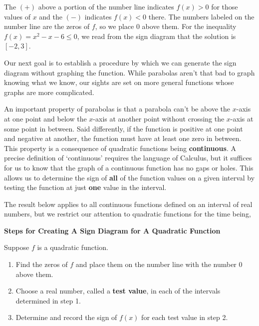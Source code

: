 \documentclass{ximera}
\begin{document}
The $(+)$ above a portion of the number line indicates $f(x) > 0$ for those values of $x$ and the $(-)$ indicates $f(x) < 0$ there.  The numbers labeled on the number line are the zeros of $f$, so we place $0$ above them.  For the inequality $f(x) = x^2-x-6 \leq 0$, we read from the sign diagram that the solution is $[-2,3]$.  

\medskip

Our next goal is to establish a procedure by which we can generate the sign diagram without graphing the function.  While parabolas aren't that bad to graph knowing what we know, our sights are set on more general functions whose graphs are more complicated.  

\medskip
\enlargethispage{.in}

An important property of parabolas is that a parabola can't be above the $x$-axis at one point and below the $x$-axis at another point without crossing the $x$-axis at some point in between. Said differently, if the function is positive at one point and negative at another, the function must have at least one zero in between.  This property is a consequence of quadratic functions being \textbf{continuous}.  A precise definition of `continuous' requires the language of Calculus, but it suffices for us to know that the graph of a continuous function has no gaps or holes.   This allows us to determine the sign of \textbf{all} of the function values on a given interval by testing the function at just \textbf{one} value in the interval.  

\medskip

The result below applies to all continuous functions defined on an interval of real numbers, but we restrict our attention to quadratic functions for the time being,

\medskip

\colorbox{ResultColor}{\bbm

\centerline{\textbf{Steps for Creating A Sign Diagram for A Quadratic Function}} 

\smallskip

Suppose $f$ is a quadratic function.

\begin{enumerate}

\item  Find the zeros of $f$ and place them on the number line with the number $0$ above them.

\item  Choose a real number, called a \textbf{test value}, in each of the intervals determined in step 1. 

\item  Determine and record the sign of $f(x)$ for each test value in step 2.

\end{enumerate}

\ebm}
\end{document}
